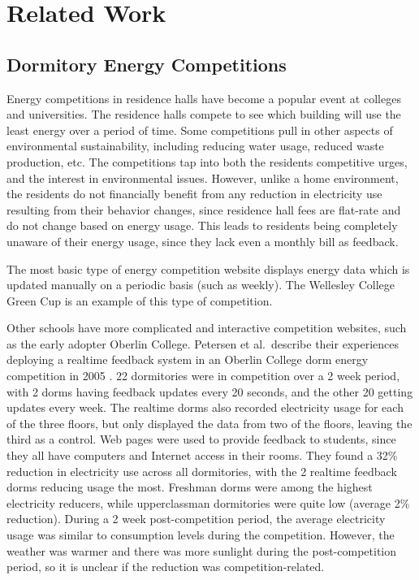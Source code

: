 \chapter{Related Work}


\section{Dormitory Energy Competitions}
\label{sec:dorm-energy-competitions}

Energy competitions in residence halls have become a popular event at colleges and universities. The residence halls compete to see which building will use the least energy over a period of time. Some competitions pull in other aspects of environmental sustainability, including reducing water usage, reduced waste production, etc. The competitions tap into both the residents competitive urges, and the interest in environmental issues. However, unlike a home environment, the residents do not financially benefit from any reduction in electricity use resulting from their behavior changes, since residence hall fees are flat-rate and do not change based on energy usage. This leads to residents being completely unaware of their energy usage, since they lack even a monthly bill as feedback.

The most basic type of energy competition website displays energy data which is updated manually on a periodic basis (such as weekly). The Wellesley College Green Cup \cite{wellesley-green-cup} is an example of this type of competition.

Other schools have more complicated and interactive competition websites, such as the early adopter Oberlin College. Petersen et al.\ describe their experiences deploying a realtime feedback system in an Oberlin College dorm energy competition in 2005 \cite{petersen-dorm-energy-reduction}. 22 dormitories were in competition over a 2 week period, with 2 dorms having feedback updates every 20 seconds, and the other 20 getting updates every week. The realtime dorms also recorded electricity usage for each of the three floors, but only displayed the data from two of the floors, leaving the third as a control. Web pages were used to provide feedback to students, since they all have computers and Internet access in their rooms. They found a 32\% reduction in electricity use across all dormitories, with the 2 realtime feedback dorms reducing usage the most. Freshman dorms were among the highest electricity reducers, while upperclassman dormitories were quite low (average 2\% reduction). During a 2 week post-competition period, the average electricity usage was similar to consumption levels during the competition. However, the weather was warmer and there was more sunlight during the post-competition period, so it is unclear if the reduction was competition-related.

